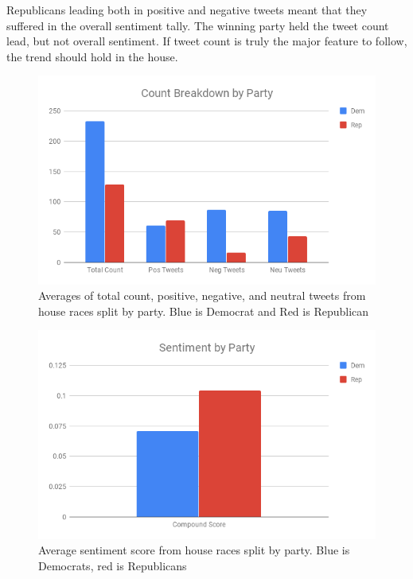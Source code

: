 \documentclass[11pt, twoside, reqno]{book}
\begin{document}
Republicans leading both in positive and negative tweets meant that they suffered in the overall sentiment tally. The winning party held the tweet count lead, but not overall sentiment. If tweet count is truly the major feature to follow, the trend should hold in the house.

\begin{figure}[H]
\centering
	\includegraphics[scale=0.5]{count_party_house}
	\caption{Averages of total count, positive, negative, and neutral tweets from house races split by party. Blue is Democrat and Red is Republican}\label{fig:count_party_house}
\end{figure}

\begin{figure}[H]
\centering
	\includegraphics[scale=0.5]{party_sent_house}
	\caption{Average sentiment score from house races split by party. Blue is Democrats, red is Republicans}\label{fig:party_sent_house}
\end{figure}
\end{document}
